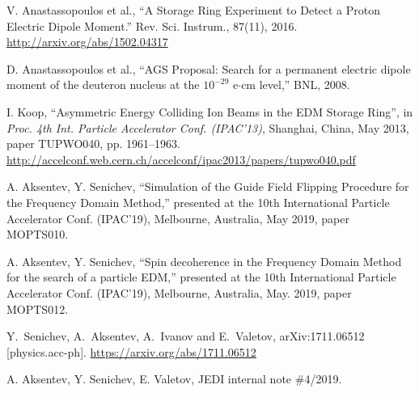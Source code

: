 \documentclass{article}
\begin{document}
\begin{thebibliography}{9}
  V. Anastassopoulos et al., ``A Storage Ring Experiment to Detect a Proton Electric Dipole Moment.''
  Rev. Sci. Instrum., 87(11), 2016.
  \url{http://arxiv.org/abs/1502.04317}

  D. Anastassopoulos et al., ``AGS Proposal: Search for a permanent electric dipole moment of
  the deuteron nucleus at the $10^{-29}$ e$\cdot$cm level,'' BNL, 2008.
  
   I. Koop,
   \textquotedblleft{Asymmetric Energy Colliding Ion Beams in the EDM Storage Ring}\textquotedblright,
   in \emph{Proc. 4th Int. Particle Accelerator Conf. (IPAC'13)}, Shanghai, China, May 2013, paper TUPWO040,
   pp. 1961--1963.
  \url{http://accelconf.web.cern.ch/accelconf/ipac2013/papers/tupwo040.pdf}

  A. Aksentev, Y. Senichev, ``Simulation of the Guide Field Flipping Procedure for the Frequency Domain Method,'' 
  presented at the 10th International Particle Accelerator Conf. (IPAC'19), Melbourne, Australia,
  May 2019, paper MOPTS010.


  A. Aksentev, Y. Senichev, ``Spin decoherence in the Frequency Domain Method for the search of a particle EDM,''
  presented at the 10th International Particle Accelerator Conf. (IPAC'19), Melbourne, Australia,
  May. 2019, paper MOPTS012.

  Y.~Senichev, A.~Aksentev, A.~Ivanov and E.~Valetov,
  arXiv:1711.06512 [physics.acc-ph].
  \url{https://arxiv.org/abs/1711.06512}

  A. Aksentev, Y. Senichev, E. Valetov, JEDI internal note \#4/2019.
  
\end{thebibliography}
\end{document}
